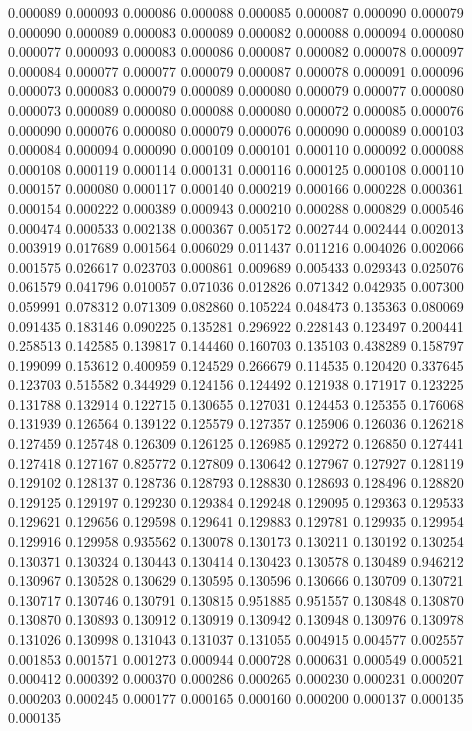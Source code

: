 0.000089
0.000093
0.000086
0.000088
0.000085
0.000087
0.000090
0.000079
0.000090
0.000089
0.000083
0.000089
0.000082
0.000088
0.000094
0.000080
0.000077
0.000093
0.000083
0.000086
0.000087
0.000082
0.000078
0.000097
0.000084
0.000077
0.000077
0.000079
0.000087
0.000078
0.000091
0.000096
0.000073
0.000083
0.000079
0.000089
0.000080
0.000079
0.000077
0.000080
0.000073
0.000089
0.000080
0.000088
0.000080
0.000072
0.000085
0.000076
0.000090
0.000076
0.000080
0.000079
0.000076
0.000090
0.000089
0.000103
0.000084
0.000094
0.000090
0.000109
0.000101
0.000110
0.000092
0.000088
0.000108
0.000119
0.000114
0.000131
0.000116
0.000125
0.000108
0.000110
0.000157
0.000080
0.000117
0.000140
0.000219
0.000166
0.000228
0.000361
0.000154
0.000222
0.000389
0.000943
0.000210
0.000288
0.000829
0.000546
0.000474
0.000533
0.002138
0.000367
0.005172
0.002744
0.002444
0.002013
0.003919
0.017689
0.001564
0.006029
0.011437
0.011216
0.004026
0.002066
0.001575
0.026617
0.023703
0.000861
0.009689
0.005433
0.029343
0.025076
0.061579
0.041796
0.010057
0.071036
0.012826
0.071342
0.042935
0.007300
0.059991
0.078312
0.071309
0.082860
0.105224
0.048473
0.135363
0.080069
0.091435
0.183146
0.090225
0.135281
0.296922
0.228143
0.123497
0.200441
0.258513
0.142585
0.139817
0.144460
0.160703
0.135103
0.438289
0.158797
0.199099
0.153612
0.400959
0.124529
0.266679
0.114535
0.120420
0.337645
0.123703
0.515582
0.344929
0.124156
0.124492
0.121938
0.171917
0.123225
0.131788
0.132914
0.122715
0.130655
0.127031
0.124453
0.125355
0.176068
0.131939
0.126564
0.139122
0.125579
0.127357
0.125906
0.126036
0.126218
0.127459
0.125748
0.126309
0.126125
0.126985
0.129272
0.126850
0.127441
0.127418
0.127167
0.825772
0.127809
0.130642
0.127967
0.127927
0.128119
0.129102
0.128137
0.128736
0.128793
0.128830
0.128693
0.128496
0.128820
0.129125
0.129197
0.129230
0.129384
0.129248
0.129095
0.129363
0.129533
0.129621
0.129656
0.129598
0.129641
0.129883
0.129781
0.129935
0.129954
0.129916
0.129958
0.935562
0.130078
0.130173
0.130211
0.130192
0.130254
0.130371
0.130324
0.130443
0.130414
0.130423
0.130578
0.130489
0.946212
0.130967
0.130528
0.130629
0.130595
0.130596
0.130666
0.130709
0.130721
0.130717
0.130746
0.130791
0.130815
0.951885
0.951557
0.130848
0.130870
0.130870
0.130893
0.130912
0.130919
0.130942
0.130948
0.130976
0.130978
0.131026
0.130998
0.131043
0.131037
0.131055
0.004915
0.004577
0.002557
0.001853
0.001571
0.001273
0.000944
0.000728
0.000631
0.000549
0.000521
0.000412
0.000392
0.000370
0.000286
0.000265
0.000230
0.000231
0.000207
0.000203
0.000245
0.000177
0.000165
0.000160
0.000200
0.000137
0.000135
0.000135
